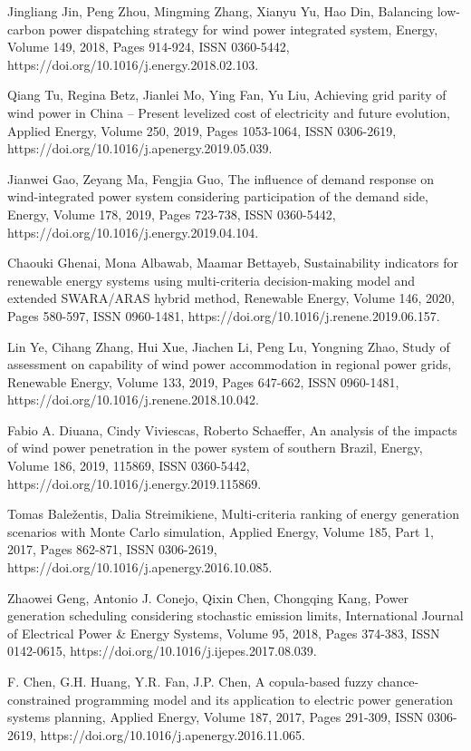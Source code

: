 \begin{thebibliography}{99}
\begin{singlespace}
 Jingliang Jin, Peng Zhou, Mingming Zhang, Xianyu Yu, Hao Din, Balancing low-carbon power dispatching strategy for wind power integrated system, Energy, Volume 149, 2018, Pages 914-924, ISSN 0360-5442, https://doi.org/10.1016/j.energy.2018.02.103.

 Qiang Tu, Regina Betz, Jianlei Mo, Ying Fan, Yu Liu, Achieving grid parity of wind power in China – Present levelized cost of electricity and future evolution, Applied Energy, Volume 250, 2019, Pages 1053-1064, ISSN 0306-2619, \\ https://doi.org/10.1016/j.apenergy.2019.05.039.

 Jianwei Gao, Zeyang Ma, Fengjia Guo, The influence of demand response on wind-integrated power system considering participation of the demand side, Energy, Volume 178, 2019, Pages 723-738, ISSN 0360-5442, https://doi.org/10.1016/j.energy.2019.04.104.

 Chaouki Ghenai, Mona Albawab, Maamar Bettayeb, Sustainability indicators for renewable energy systems using multi-criteria decision-making model and extended SWARA/ARAS hybrid method, Renewable  Energy, Volume 146, 2020, Pages 580-597, ISSN 0960-1481, https://doi.org/10.1016/j.renene.2019.06.157.

 Lin Ye, Cihang Zhang, Hui Xue, Jiachen Li, Peng Lu, Yongning Zhao, Study of assessment on capability of wind power accommodation in regional power grids, Renewable Energy, Volume 133, 2019, Pages 647-662, ISSN 0960-1481, https://doi.org/10.1016/j.renene.2018.10.042.

 Fabio A. Diuana, Cindy Viviescas, Roberto Schaeffer, An analysis of the impacts of wind power penetration in the power system of southern Brazil, Energy, Volume 186, 2019, 115869, ISSN 0360-5442, \\ https://doi.org/10.1016/j.energy.2019.115869.

 Tomas Baležentis, Dalia Streimikiene, Multi-criteria ranking of energy generation scenarios with Monte Carlo simulation, Applied Energy, Volume 185, Part 1, 2017, Pages 862-871, ISSN 0306-2619, https://doi.org/10.1016/j.apenergy.2016.10.085.

 Zhaowei Geng, Antonio J. Conejo, Qixin Chen, Chongqing Kang, Power generation scheduling considering stochastic emission limits, International Journal of Electrical Power \& Energy Systems, Volume 95, 2018, Pages 374-383, ISSN 0142-0615, https://doi.org/10.1016/j.ijepes.2017.08.039.

F. Chen, G.H. Huang, Y.R. Fan, J.P. Chen, A copula-based fuzzy chance-constrained programming model and its application to electric power generation systems planning, Applied Energy, Volume 187, 2017, Pages 291-309, ISSN 0306-2619, https://doi.org/10.1016/j.apenergy.2016.11.065. 

\end{singlespace}

\end{thebibliography}